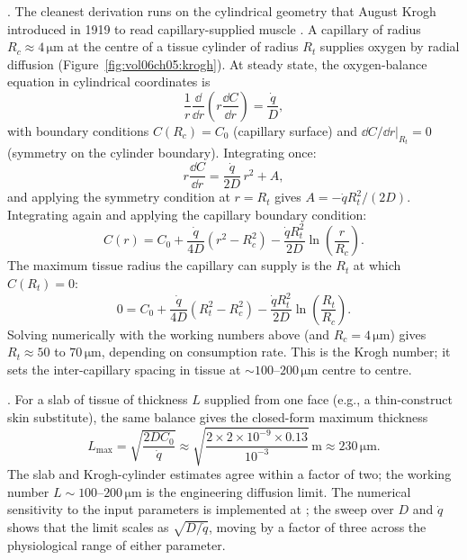 . The cleanest derivation runs
on the cylindrical geometry that August Krogh introduced in 1919
to read capillary-supplied muscle \cite{paper:v6c05-krogh-1919}.
A capillary of radius $R_c \approx 4\,\si{\micro\meter}$ at the
centre of a tissue cylinder of radius $R_t$ supplies oxygen by radial
diffusion (Figure~\ref{fig:vol06ch05:krogh}). At steady state, the
oxygen-balance equation in cylindrical coordinates is
\[
\frac{1}{r}\frac{\dd}{\dd r}\!\left(r \frac{\dd C}{\dd r}\right)
  = \frac{\dot{q}}{D},
\]
with boundary conditions $C(R_c) = C_0$ (capillary surface) and
$\dd C/\dd r |_{R_t} = 0$ (symmetry on the cylinder boundary).
Integrating once:
\[
r\frac{\dd C}{\dd r} = \frac{\dot{q}}{2D}\,r^2 + A,
\]
and applying the symmetry condition at $r = R_t$ gives
$A = -\dot{q} R_t^2/(2D)$. Integrating again and applying the
capillary boundary condition:
\[
C(r) = C_0 + \frac{\dot{q}}{4D}(r^2 - R_c^2)
       - \frac{\dot{q} R_t^2}{2D}\ln\!\left(\frac{r}{R_c}\right).
\]
The maximum tissue radius the capillary can supply is the $R_t$
at which $C(R_t) = 0$:
\[
0 = C_0 + \frac{\dot{q}}{4D}(R_t^2 - R_c^2)
       - \frac{\dot{q} R_t^2}{2D}\ln\!\left(\frac{R_t}{R_c}\right).
\]
Solving numerically with the working numbers above (and
$R_c = 4\,\si{\micro\meter}$) gives $R_t \approx 50$ to
$70\,\si{\micro\meter}$, depending on consumption rate. This is the
Krogh number; it sets the inter-capillary spacing in tissue at
$\sim 100$--$200\,\si{\micro\meter}$ centre to centre.



. For a slab of tissue of thickness $L$
supplied from one face (e.g., a thin-construct skin substitute),
the same balance gives the closed-form maximum thickness
\[
L_{\max} = \sqrt{\frac{2 D C_0}{\dot{q}}}
        \approx \sqrt{\frac{2 \times 2\times 10^{-9} \times 0.13}{10^{-3}}}
        \,\text{m}
        \approx 230\,\si{\micro\meter}.
\]
The slab and Krogh-cylinder estimates agree within a factor of two;
the working number $L \sim 100$--$200\,\si{\micro\meter}$ is the
engineering diffusion limit. The numerical sensitivity to the input
parameters is implemented at
; the sweep over $D$ and
$\dot{q}$ shows that the limit scales as $\sqrt{D/\dot{q}}$,
moving by a factor of three across the physiological range of
either parameter.

